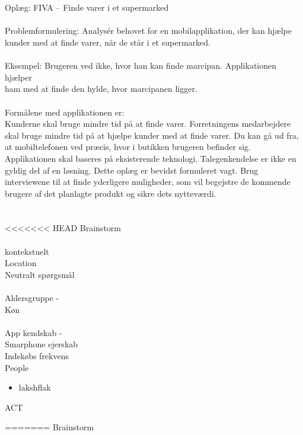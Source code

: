 \documentclass[12pt]{article}
\begin{document}
\section*{}
Oplæg: FIVA – Finde varer i et supermarked\\
\\
Problemformulering: Analysér behovet for en mobilapplikation, der kan hjælpe kunder med at finde varer, når de står i et
supermarked.\\
\\
Eksempel: Brugeren ved ikke, hvor han kan finde marcipan. Applikationen hjælper\\
ham med at finde den hylde, hvor marcipanen ligger.\\
\\
Formålene med applikationen er:\\
Kunderne skal bruge mindre tid på at finde varer.
Forretningens medarbejdere skal bruge mindre tid på at hjælpe kunder med at finde varer. Du kan gå ud fra, at mobiltelefonen ved præcis, hvor i butikken brugeren befinder sig. Applikationen skal baseres på eksisterende teknologi. Talegenkendelse er ikke en gyldig del af en løsning. Dette oplæg er bevidst formuleret vagt. Brug interviewene til at finde yderligere muligheder, som vil begejstre de kommende brugere af det planlagte produkt og sikre dets nytteværdi.

\section*{}
<<<<<<< HEAD
Brainstorm\\
\\
kontekstuelt\\
Location\\
Neutralt sp\o rgsm\aa l\\
\\
Aldersgruppe - \\ 
K\o n\\
\\
App kendskab - \\
Smarphone ejerskab\\
Indsk\o bs frekvens\\


People
\begin{itemize}
\item lakshflak
\end{itemize}


ACT

   
=======
 Brainstorm
\end{document}
